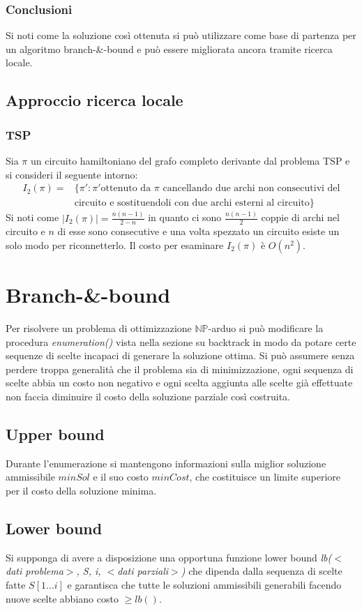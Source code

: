 \subsubsection{Conclusioni}
Si noti come la soluzione cos\`i ottenuta si pu\`o utilizzare come base di partenza per un algoritmo branch-\&-bound e pu\`o essere migliorata ancora tramite ricerca locale. 
\subsection{Approccio ricerca locale}
\subsubsection{TSP}
Sia $\pi$ un circuito hamiltoniano del grafo completo derivante dal problema TSP e si consideri il seguente intorno:
\begin{align*}
	I_2(\pi) = &\{\pi': \pi' \text{ottenuto da } \pi\text{ cancellando due archi non consecutivi del} \\
		   &\text{circuito e sostituendoli con due archi esterni al circuito}\}
\end{align*}
Si noti come $|I_2(\pi)| = \frac{n(n-1)}{2-n}$ in quanto ci sono $\frac{n(n-1)}{2}$ coppie di archi nel circuito e $n$ di esse sono consecutive e una volta spezzato un circuito esiste
un solo modo per riconnetterlo. Il costo per esaminare $I_2(\pi)$ \`e $O(n^2)$. 
\section{Branch-\&-bound}
Per risolvere un problema di ottimizzazione $\mathbb{NP}$-arduo si pu\`o modificare la procedura \emph{enumeration()} vista nella sezione su backtrack in modo da potare certe sequenze
di scelte incapaci di generare la soluzione ottima. Si pu\`o assumere senza perdere troppa generalit\`a che il problema sia di minimizzazione, ogni sequenza di scelte abbia un costo non
negativo e ogni scelta aggiunta alle scelte gi\`a effettuate non faccia diminuire il costo della soluzione parziale cos\`i costruita. 
\subsection{Upper bound}
Durante l'enumerazione si mantengono informazioni sulla miglior soluzione ammissibile $minSol$ e il suo costo $minCost$, che costituisce un limite superiore per il costo della soluzione
minima. 
\subsection{Lower bound}
Si supponga di avere a disposizione una opportuna funzione lower bound \emph{lb($<$dati problema$>$, S, i, $<$dati parziali$>$)} che dipenda dalla sequenza di scelte fatte $S[1\dots i]$
e garantisca che tutte le soluzioni ammissibili generabili facendo nuove scelte abbiano costo $\ge lb()$.
